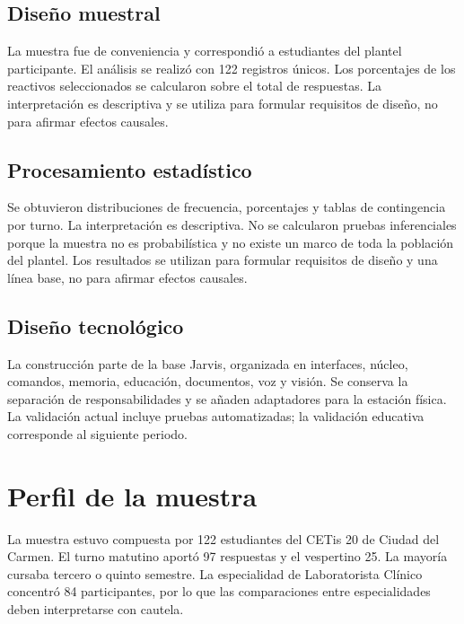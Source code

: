 \documentclass[letterpaper,11pt]{article}
\begin{document}
\subsection*{Diseño muestral}
La muestra fue de conveniencia y correspondió a estudiantes del plantel participante. El análisis se realizó con 122 registros únicos. Los porcentajes de los reactivos seleccionados se calcularon sobre el total de respuestas. La interpretación es descriptiva y se utiliza para formular requisitos de diseño, no para afirmar efectos causales.

\subsection*{Procesamiento estadístico}
Se obtuvieron distribuciones de frecuencia, porcentajes y tablas de contingencia por turno. La interpretación es descriptiva. No se calcularon pruebas inferenciales porque la muestra no es probabilística y no existe un marco de toda la población del plantel. Los resultados se utilizan para formular requisitos de diseño y una línea base, no para afirmar efectos causales.

\subsection*{Diseño tecnológico}
La construcción parte de la base Jarvis, organizada en interfaces, núcleo, comandos, memoria, educación, documentos, voz y visión. Se conserva la separación de responsabilidades y se añaden adaptadores para la estación física. La validación actual incluye pruebas automatizadas; la validación educativa corresponde al siguiente periodo.

\clearpage

\section{Perfil de la muestra}

La muestra estuvo compuesta por 122 estudiantes del CETis 20 de Ciudad del Carmen. El turno matutino aportó 97 respuestas y el vespertino 25. La mayoría cursaba tercero o quinto semestre. La especialidad de Laboratorista Clínico concentró 84 participantes, por lo que las comparaciones entre especialidades deben interpretarse con cautela.
\end{document}
